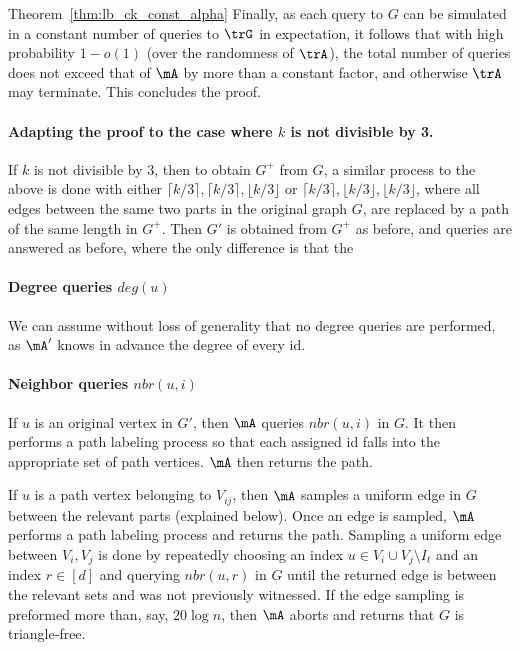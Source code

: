 \begin{proofof}{Theorem~\ref{thm:lb_ck_const_alpha}}
\bigskip
Finally, as each query to $G$ can be simulated in a constant number of queries to $\trG$ in expectation, it follows that with high probability $1-o(1)$ (over the randomness of $\trA$), the total number of queries does not exceed that of $\mA$ by more than a constant factor, %
and otherwise $\trA$ may terminate.
  This concludes the proof.
\iffalse
\paragraph{Adapting the proof to the case where $k$ is not divisible by 3.}
If $k$ is not divisible by $3$, then  to obtain $G^+$ from $G$, 
a similar process to the above is done with either $\lceil k/3\rceil, \lceil k/3\rceil, \lfloor k/3\rfloor$ or $\lceil k/3\rceil, \lfloor k/3\rfloor, \lfloor k/3\rfloor$, where all edges between the same two parts in the original graph $G$, are replaced by a path of the same length in $G^+$.
Then $G'$ is obtained from $G^+$ as before, and queries are answered as before, where the only difference is that the 

\paragraph{Degree queries $deg(u)$}
We can assume without loss of generality that no degree queries are performed, as $\mA'$ knows in advance the degree of every id. 

\paragraph{Neighbor queries $nbr(u, i)$}
If $u$ is an original vertex in $G'$, then $\mA$ queries $nbr(u,i)$ in $G$. It then performs a path labeling process so that each assigned id falls into the appropriate set of path vertices.  $\mA$ then returns the path.

If $u$ is a path vertex belonging to $V_{ij}$, then $\mA$ samples a uniform edge in $G$ between the relevant parts (explained below). Once an edge is sampled, $\mA$  performs a path labeling process and returns the path.
Sampling a uniform edge between $V_i, V_j$ is done by repeatedly choosing an index  $u\in V_i\cup V_j \setminus I_t$ and an index $r\in [d]$ and querying $nbr(u,r)$ in $G$ until the returned edge is between the relevant sets and was not previously witnessed.  If the edge sampling is preformed more than, say, $20\log n$, then $\mA$ aborts and returns that $G$ is triangle-free. 


\end{proofof}
